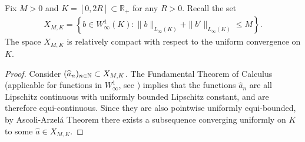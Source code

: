 \begin{proposition}\label{XMdef}
Fix $M > 0$ and $K=[0,2R] \subset  \mathbb R_+$ for any $R>0$. Recall the set
\begin{align*}
X_{M,K} = \left\{b \in W^{1}_{\infty}(K) :
 \|b\|_{L_{\infty}(K)} + \|b'\|_{L_{\infty}(K)} \leq M
 \right\}.
\end{align*}
The space $X_{M,K}$ is relatively compact with respect to the uniform convergence on $K$.
\end{proposition}
\begin{proof}
Consider $(\widehat a_n)_{n \in \mathbb{N}} \subset X_{M,K}$. The Fundamental Theorem of Calculus (applicable for functions in $W^{1}_{\infty}$, see \cite[Theorem 2.8]{AFP00}) 
implies that the functions $\widehat a_n$ are all Lipschitz continuous with uniformly bounded Lipschitz constant, and are therefore equi-continuous. Since they are also pointwise uniformly equi-bounded,
by Ascoli-Arzel\'a Theorem there exists a subsequence converging uniformly on $K$ to some $\widehat a \in X_{M,K}$.
\end{proof}

